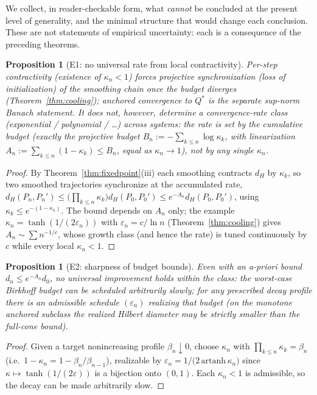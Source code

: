 \documentclass[11pt]{article}
\theoremstyle{plain}
\newtheorem{proposition}[theorem]{Proposition}
\theoremstyle{definition}
\theoremstyle{remark}
\begin{document}
We collect, in reader-checkable form, what \emph{cannot} be concluded at the present level of generality, and the minimal structure that would change each conclusion. These are not statements of empirical uncertainty: each is a consequence of the preceding theorems.

\begin{proposition}[E1: no universal rate from local contractivity]\label{E1}
Per-step contractivity (existence of $\kappa_n<1$) forces projective synchronization (loss of initialization) of the smoothing chain once the budget diverges (Theorem~\ref{thm:cooling}); anchored convergence to $Q^*$ is the separate sup-norm Banach statement. It does not, however, determine a convergence-rate class (exponential / polynomial / \dots) across systems: the rate is set by the cumulative budget (exactly the projective budget $B_n:=-\sum_{k\le n}\log\kappa_k$, with linearization $A_n:=\sum_{k\le n}(1-\kappa_k)\le B_n$, equal as $\kappa_n\to1$), not by any single $\kappa_n$.
\end{proposition}
\begin{proof}
By Theorem~\ref{thm:fixedpoint}(iii) each smoothing contracts $d_H$ by $\kappa_k$, so two smoothed trajectories synchronize at the accumulated rate, $d_H(P_n,P_n')\le\big(\prod_{k\le n}\kappa_k\big)d_H(P_0,P_0')\le e^{-A_n}d_H(P_0,P_0')$, using $\kappa_k\le e^{-(1-\kappa_k)}$. The bound depends on $A_n$ only; the example $\kappa_n=\tanh(1/(2\varepsilon_n))$ with $\varepsilon_n=c/\ln n$ (Theorem~\ref{thm:cooling}) gives $A_n\sim\sum n^{-1/c}$, whose growth class (and hence the rate) is tuned continuously by $c$ while every local $\kappa_n<1$.
\end{proof}

\begin{proposition}[E2: sharpness of budget bounds]\label{E2}
Even with an a-priori bound $d_n\le e^{-A_n}d_0$, no universal improvement holds within the class: the worst-case Birkhoff budget can be scheduled arbitrarily slowly; for any prescribed decay profile there is an admissible schedule $(\varepsilon_n)$ realizing that budget (on the monotone anchored subclass the realized Hilbert diameter may be strictly smaller than the full-cone bound).
\end{proposition}
\begin{proof}
Given a target nonincreasing profile $\beta_n\downarrow0$, choose $\kappa_n$ with $\prod_{k\le n}\kappa_k=\beta_n$ (i.e.\ $1-\kappa_n=1-\beta_n/\beta_{n-1}$), realizable by $\varepsilon_n=1/\big(2\,\mathrm{artanh}\,\kappa_n\big)$ since $\kappa\mapsto\tanh(1/(2\varepsilon))$ is a bijection onto $(0,1)$. Each $\kappa_n<1$ is admissible, so the decay can be made arbitrarily slow.
\end{proof}
\end{document}
